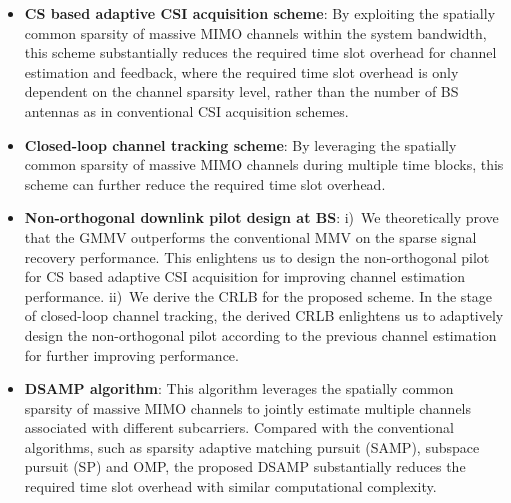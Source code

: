 \documentclass[final]{IEEEtran}
\begin{document}
\begin{itemize}
\item \textbf{CS based adaptive CSI acquisition scheme}: By exploiting the spatially
 common sparsity of massive MIMO channels within the system bandwidth, this scheme
 substantially reduces the required time slot overhead for channel estimation and feedback,
 where the required time slot overhead is only dependent on the channel sparsity level,
 rather than the number of BS antennas as in conventional CSI acquisition schemes.
\item \textbf{Closed-loop channel tracking scheme}: By leveraging the spatially common
 sparsity of massive MIMO channels during multiple time blocks, this scheme can further
 reduce the required time slot overhead.
\item \textbf{Non-orthogonal downlink pilot design at BS}: i)~We theoretically prove
 that the GMMV outperforms the conventional MMV on the sparse signal recovery performance.
 This enlightens us to design the non-orthogonal pilot for CS based adaptive CSI acquisition
 for improving channel estimation performance. ii)~We derive the CRLB for the proposed
 scheme. In the stage of closed-loop channel tracking, the derived CRLB enlightens us to
 adaptively design the non-orthogonal pilot according to the previous channel estimation
 for further improving performance.
\item \textbf{DSAMP algorithm}: This algorithm leverages the spatially common sparsity of
 massive MIMO channels to jointly estimate multiple channels associated with different
 subcarriers. Compared with the conventional algorithms, such as sparsity adaptive
 matching pursuit (SAMP), subspace pursuit (SP) and OMP, the proposed DSAMP substantially
 reduces the required time slot overhead with similar computational complexity.
\end{itemize}
\end{document}
